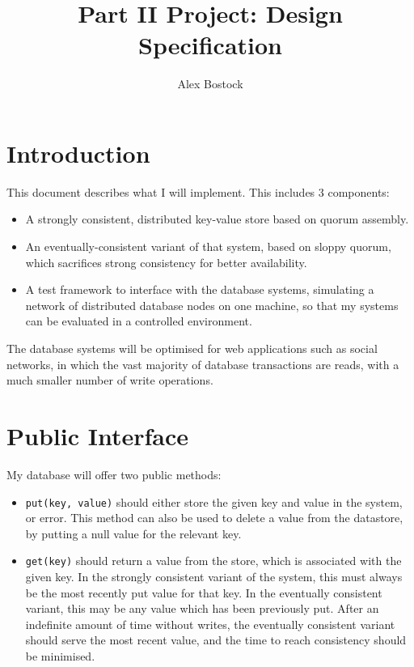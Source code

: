 \documentclass[12pt,a4paper]{article}
\title{Part II Project: Design Specification}
\author{Alex Bostock}
\date{}
\begin{document}
\maketitle
\thispagestyle{fancy}

\section*{Introduction}

This document describes what I will implement. This includes 3 components:

\begin{itemize}
  \item
  A strongly consistent, distributed key-value store based on quorum assembly.

  \item
  An eventually-consistent variant of that system, based on sloppy quorum, which sacrifices strong consistency for better availability.

  \item
  A test framework to interface with the database systems, simulating a network of distributed database nodes on one machine, so that my systems can be evaluated in a controlled environment.

\end{itemize}

The database systems will be optimised for web applications such as social networks, in which the vast majority of database transactions are reads, with a much smaller number of write operations.

\section*{Public Interface}

My database will offer two public methods:

\begin{itemize}
  \item
  \verb|put(key, value)| should either store the given key and value in the system, or error. This method can also be used to delete a value from the datastore, by putting a null value for the relevant key.

  \item
  \verb|get(key)| should return a value from the store, which is associated with the given key. In the strongly consistent variant of the system, this must always be the most recently put value for that key. In the eventually consistent variant, this may be any value which has been previously put. After an indefinite amount of time without writes, the eventually consistent variant should serve the most recent value, and the time to reach consistency should be minimised.

\end{itemize}
\end{document}
